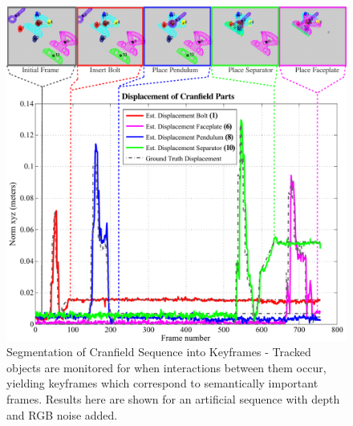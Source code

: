 \begin{figure}[!ht]
  \centering
  \includegraphics[width=\linewidth]{figures/Tracking/Action_Segmentation.pdf}
  \caption[Segmentation of Actions]{Segmentation of Cranfield Sequence into Keyframes - Tracked objects are monitored for when interactions between them occur, yielding keyframes which correspond to semantically important frames. Results here are shown for an artificial sequence with depth and RGB noise added.}
  \label{fig:ActionSegmentation}
\end{figure}






